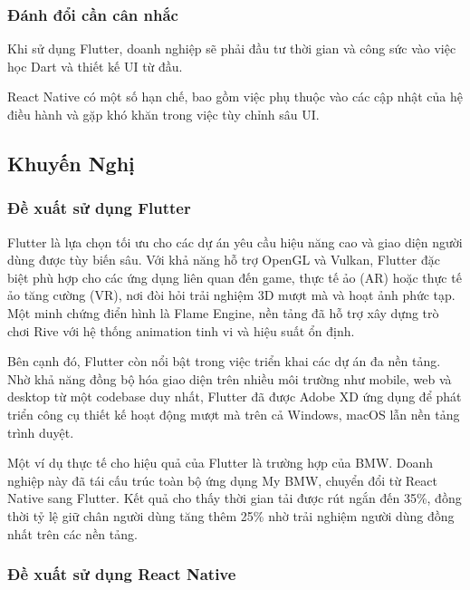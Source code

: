 \subsubsection{Đánh đổi cần cân nhắc}

    Khi sử dụng Flutter, doanh nghiệp sẽ phải đầu tư thời gian và công sức vào việc học Dart và thiết kế UI từ đầu.
\vspace{0.5em}


    React Native có một số hạn chế, bao gồm việc phụ thuộc vào các cập nhật của hệ điều hành và gặp khó khăn trong việc tùy chỉnh sâu UI.

\subsection{Khuyến Nghị}

\subsubsection{Đề xuất sử dụng Flutter}

\indent Flutter là lựa chọn tối ưu cho các dự án yêu cầu hiệu năng cao và giao diện người dùng được tùy biến sâu. Với khả năng hỗ trợ OpenGL và Vulkan, Flutter đặc biệt phù hợp cho các ứng dụng liên quan đến game, thực tế ảo (AR) hoặc thực tế ảo tăng cường (VR), nơi đòi hỏi trải nghiệm 3D mượt mà và hoạt ảnh phức tạp. Một minh chứng điển hình là Flame Engine, nền tảng đã hỗ trợ xây dựng trò chơi Rive với hệ thống animation tinh vi và hiệu suất ổn định.

\vspace{0.5em}

\indent Bên cạnh đó, Flutter còn nổi bật trong việc triển khai các dự án đa nền tảng. Nhờ khả năng đồng bộ hóa giao diện trên nhiều môi trường như mobile, web và desktop từ một codebase duy nhất, Flutter đã được Adobe XD ứng dụng để phát triển công cụ thiết kế hoạt động mượt mà trên cả Windows, macOS lẫn nền tảng trình duyệt.

\vspace{0.5em}

\indent Một ví dụ thực tế cho hiệu quả của Flutter là trường hợp của BMW. Doanh nghiệp này đã tái cấu trúc toàn bộ ứng dụng My BMW, chuyển đổi từ React Native sang Flutter. Kết quả cho thấy thời gian tải được rút ngắn đến 35\%, đồng thời tỷ lệ giữ chân người dùng tăng thêm 25\% nhờ trải nghiệm người dùng đồng nhất trên các nền tảng.

\subsubsection{Đề xuất sử dụng React Native}

